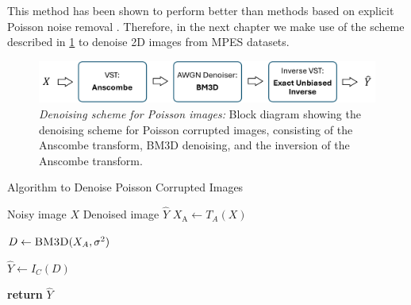 This method has been shown to perform better than methods based on explicit Poisson noise removal \cite{makitaloOptimalInversionAnscombe2011}. Therefore, in the next chapter we make use of the scheme described in \cref{fig:anscombe-bm3d} to denoise 2D images from \gls{MPES} datasets.

\begin{figure} 
    \centering
    \includegraphics[width=1\linewidth]{images/bm3d_anscombe_scheme.pdf}
    \caption{\textit{Denoising scheme for Poisson images:} Block diagram showing the denoising scheme for Poisson corrupted images, consisting of the Anscombe transform, BM3D denoising, and the inversion of the Anscombe transform.}
    \label{fig:anscombe-bm3d}
\end{figure}

\begin{algorithm}
    \caption{Algorithm to Denoise Poisson Corrupted Images}\label{alg:anscombe-bm3d}
    \begin{algorithmic}[1]
    \Require Noisy image $X$
    \Ensure Denoised image $\hat{Y}$
    \Statex
        \State $X_{\text{A}} \gets T_A(X)$
        
        \State $D \gets \textsc{BM3D}(X_A, \sigma^2)$
        
        \State $\hat{Y} \gets I_C(D)$
        
        \State \textbf{return} $\hat{Y}$
    \EndProcedure
    \end{algorithmic}
\end{algorithm}


